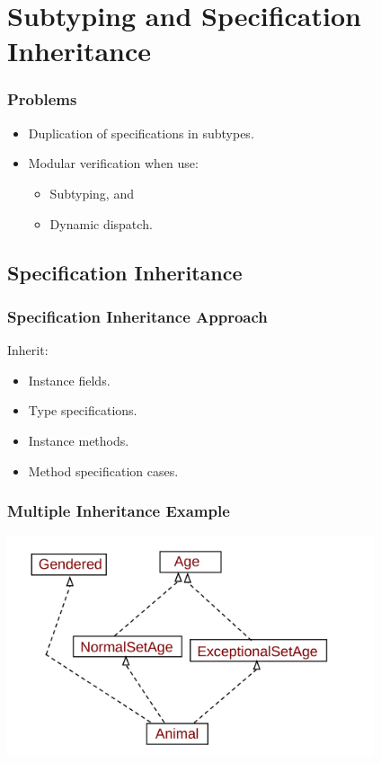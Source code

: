 \section[Subtypes]{Subtyping and Specification Inheritance}

\begin{frame}
\frametitle{Problems}
\begin{itemize}
\item
Duplication of specifications in subtypes.

\item
Modular verification when use:
\begin{itemize}
\item
Subtyping, and

\item
Dynamic dispatch.
\end{itemize}
\end{itemize}
\end{frame}

\subsection[Spec. Inh.]{Specification Inheritance}

\begin{frame}
\frametitle{Specification Inheritance Approach}

Inherit:
\begin{itemize}
\item
Instance fields.

\item
Type specifications.

\item
Instance methods.

\item
Method specification cases.
\end{itemize}
\end{frame}

\begin{frame}
\frametitle{Multiple Inheritance Example}
\includegraphics[width=4.25in]{multiple-inh}
\end{frame}

